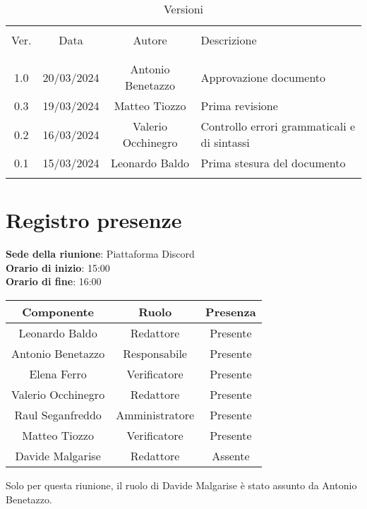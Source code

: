 \documentclass[italian,12pt]{article} %
\begin{document}


\newpage





\begin{table}[!h]
	\caption{Versioni}
	\begin{center}
		\begin{tabular}{ c c c p{9cm}}
			\hline \\[-2ex]
			Ver. & Data & Autore & Descrizione \\
			\\[-2ex] \hline \\[-1.5ex]
			1.0 & 20/03/2024 & Antonio Benetazzo & Approvazione documento \\
			0.3 & 19/03/2024 & Matteo Tiozzo & Prima revisione \\
			0.2 & 16/03/2024 & Valerio Occhinegro& Controllo errori grammaticali e di sintassi  \\
			0.1 & 15/03/2024 & Leonardo Baldo& Prima stesura del documento \\
			\\[-1.5ex] \hline
		\end{tabular}
	\end{center}
\end{table}
\newpage

\tableofcontents

\newpage

\section{Registro presenze}


\textbf{Sede della riunione}: Piattaforma Discord\\
\textbf{Orario di inizio}: 15:00\\
\textbf{Orario di fine}: 16:00\\

\begin{flushleft}
\begin{table}[!h]
\begin{tabular}{ |c|c|c| } 
	\hline
	\textbf{Componente} & \textbf{Ruolo} & \textbf{Presenza} \\
	\hline 
	Leonardo Baldo 		& Redattore & Presente \\ 
	Antonio Benetazzo 	& Responsabile & Presente \\
	Elena Ferro 		& Verificatore & Presente \\
	Valerio Occhinegro 	& Redattore & Presente \\
	Raul Seganfreddo 	& Amministratore & Presente \\
	Matteo Tiozzo 		& Verificatore & Presente \\ 
	Davide Malgarise 	& Redattore & Assente \\
	\hline
\end{tabular}
\end{table}
Solo per questa riunione, il ruolo di Davide Malgarise è stato assunto da Antonio Benetazzo.
\end{flushleft}
\end{document}
